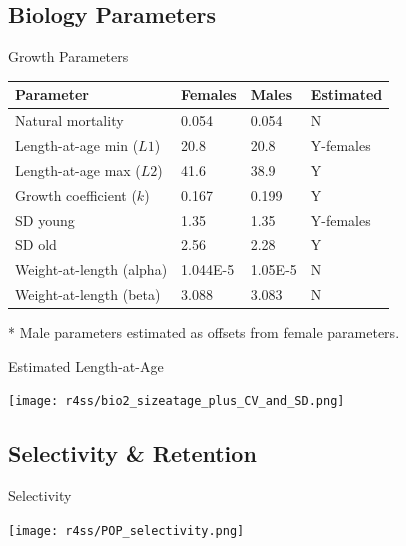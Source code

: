 \documentclass[pdf]{beamer}\usepackage[]{graphicx}\usepackage[]{color}
\begin{document}
\subsection{Biology Parameters}
\begin{frame}{Growth Parameters}
  \begin{table}[ht]
  \small
  \centering
  \begin{tabular}{p{1.5in}p{0.5in}p{0.5in}p{0.75in}}
  Parameter & Females & Males & Estimated  \\ 
  \hline
  Natural mortality  & 0.054 & 0.054 & N \\
  Length-at-age min ($L1$) & 20.8  & 20.8 & Y-females \\
  Length-at-age max ($L2$) & 41.6  & 38.9 & Y \\
  Growth coefficient ($k$) & 0.167 & 0.199 & Y \\
  SD young & 1.35 & 1.35 & Y-females \\
  SD old   & 2.56 & 2.28 & Y \\
  Weight-at-length (alpha) & 1.044E-5 & 1.05E-5 & N \\
  Weight-at-length (beta)  & 3.088 & 3.083 & N \\
  \hline
  \end{tabular}
  \end{table}
  * Male parameters estimated as offsets from female parameters.
\end{frame}

\begin{frame}{Estimated Length-at-Age}
  \begin{center}
    \texttt{[image: r4ss/bio2\_sizeatage\_plus\_CV\_and\_SD.png]}
  \end{center}
\end{frame}

\subsection{Selectivity \& Retention}
\begin{frame}{Selectivity}
  \begin{center}
    \texttt{[image: r4ss/POP\_selectivity.png]}
  \end{center}
\end{frame}
\end{document}
